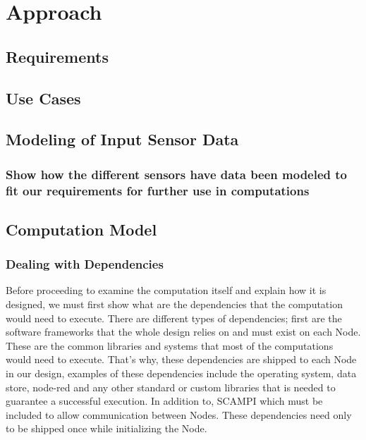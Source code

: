 
\chapter{Approach}\label{chapter:Approach}

\section{Requirements}
\section{Use Cases}
\section{Modeling of Input Sensor Data}
\subsection{Show how the different sensors have data been modeled to fit our requirements for further use in computations}



\section{Computation Model}
\newpage
\subsection{Dealing with Dependencies}
Before proceeding to examine the computation itself and explain how it is designed, we must first show what are the dependencies that the computation would need to execute. There are different types of dependencies; first are the software frameworks that the whole design relies on and must exist on each Node. These are the common libraries and systems that most of the computations would need to execute. That's why, these dependencies are shipped to each Node in our design, examples of these dependencies include the operating system, data store, node-red and any other standard or custom libraries that is needed to guarantee a successful execution. In addition to, SCAMPI which must be included to allow communication between Nodes. These dependencies need only to be shipped once while initializing the Node.

